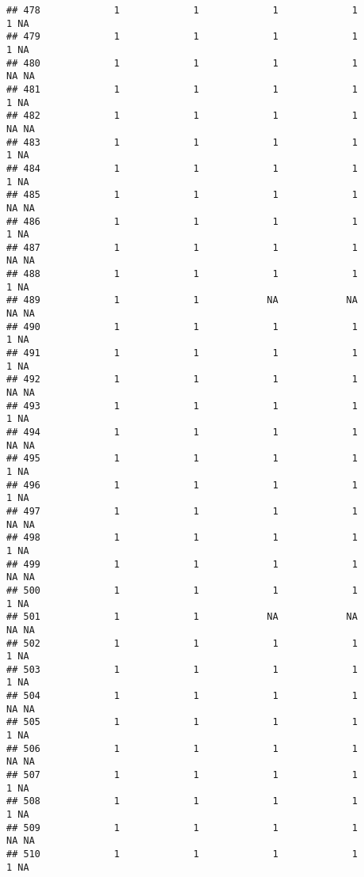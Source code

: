 \documentclass[
]{article}
\begin{document}
\begin{verbatim}
## 478             1             1             1             1             1 NA
## 479             1             1             1             1             1 NA
## 480             1             1             1             1            NA NA
## 481             1             1             1             1             1 NA
## 482             1             1             1             1            NA NA
## 483             1             1             1             1             1 NA
## 484             1             1             1             1             1 NA
## 485             1             1             1             1            NA NA
## 486             1             1             1             1             1 NA
## 487             1             1             1             1            NA NA
## 488             1             1             1             1             1 NA
## 489             1             1            NA            NA            NA NA
## 490             1             1             1             1             1 NA
## 491             1             1             1             1             1 NA
## 492             1             1             1             1            NA NA
## 493             1             1             1             1             1 NA
## 494             1             1             1             1            NA NA
## 495             1             1             1             1             1 NA
## 496             1             1             1             1             1 NA
## 497             1             1             1             1            NA NA
## 498             1             1             1             1             1 NA
## 499             1             1             1             1            NA NA
## 500             1             1             1             1             1 NA
## 501             1             1            NA            NA            NA NA
## 502             1             1             1             1             1 NA
## 503             1             1             1             1             1 NA
## 504             1             1             1             1            NA NA
## 505             1             1             1             1             1 NA
## 506             1             1             1             1            NA NA
## 507             1             1             1             1             1 NA
## 508             1             1             1             1             1 NA
## 509             1             1             1             1            NA NA
## 510             1             1             1             1             1 NA

\end{verbatim}
\end{document}
